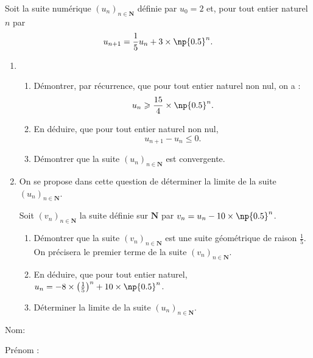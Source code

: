 \documentclass[a4paper,12pt,french]{article}
\newcommand{\N}{\mathbf{N}}
\begin{document}
\begin{Exercise}[number=3]
  Soit la suite numérique $(u_n)_{n\in\N}$ définie par $u_0 = 2$ et,
  pour tout entier naturel $n$ par \[ u_{n+1} = \frac15u_n + 3 \times
  \np{0.5}^n. \]
  \begin{enumerate}
    \item \begin{enumerate}
        \item Démontrer, par récurrence, que pour tout entier naturel
          non nul, on a : \[ u_n \geqslant \frac{15}4 \times
          \np{0.5}^n.\]
        \item En déduire, que pour tout entier naturel non nul, \[
          u_{n+1} - u_n \leqslant 0.\]
        \item Démontrer que la suite $(u_n)_{n\in\N}$ est convergente.
      \end{enumerate}
    \item On se propose dans cette question de déterminer la limite de
      la suite $(u_n)_{n\in\N}$.

      Soit $(v_n)_{n\in\N}$ la suite définie sur $\N$ par $v_n = u_n -
      10\times \np{0.5}^n$.
      \begin{enumerate}
        \item Démontrer que la suite $(v_n)_{n\in\N}$ est une suite
          géométrique de raison $\frac15$. On précisera le premier terme
          de la suite $(v_n)_{n\in\N}$.
        \item En déduire, que pour tout entier naturel, $u_n = -8 \times
          \left(\frac15\right)^n + 10\times \np{0.5}^n$.
        \item Déterminer la limite de la suite $(u_n)_{n\in\N}$.
      \end{enumerate}
  \end{enumerate}
\end{Exercise}

\pagebreak
Nom:

Prénom :

\vspace{1cm}
\hfill
{}
\hfill~
\end{document}
